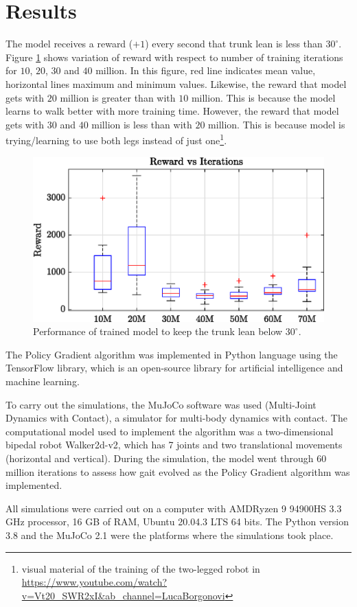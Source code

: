 \section{Results}
The model receives a reward ($+1$) every second that trunk lean is less than $30^{\circ}$. Figure \ref{fig:boxplot} shows variation of reward with respect to number of training iterations for $10$, $20$, $30$ and $40$ million. In this figure, red line indicates mean value, horizontal lines maximum and minimum values. Likewise, the reward that model gets with $20$ million is greater than with $10$ million. This is because the model learns to walk better with more training time. However, the reward that model gets with $30$ and $40$ million is less than with $20$ million. This is because model is trying/learning to use both legs instead of just one\footnote{visual material of the training of the two-legged robot in \url{https://www.youtube.com/watch?v=Vt20_SWR2xI&ab_channel=LucaBorgonovi}}.

\begin{figure}
	\centering
	\includegraphics{images/reward_vs_iter.eps}
	\caption{Performance of trained model to keep the trunk lean below $30^{\circ}$.}
	\label{fig:boxplot}
\end{figure}

The Policy Gradient algorithm was implemented in Python language using the TensorFlow library, which is an open-source library for artificial intelligence and machine learning.

To carry out the simulations, the MuJoCo software was used (Multi-Joint Dynamics with Contact), a simulator for multi-body dynamics with contact. The computational model used to implement the algorithm was a two-dimensional bipedal robot Walker2d-v2, which has 7 joints and two translational movements (horizontal and vertical). During the simulation, the model went through 60 million iterations to assess how gait evolved as the Policy Gradient algorithm was implemented.

All simulations were carried out on a computer with AMD\textregistered Ryzen 9 94900HS 3.3 GHz processor, 16 GB of RAM, Ubuntu 20.04.3 LTS 64 bits. The Python version 3.8 and the MuJoCo 2.1 were the platforms where the simulations took place.
